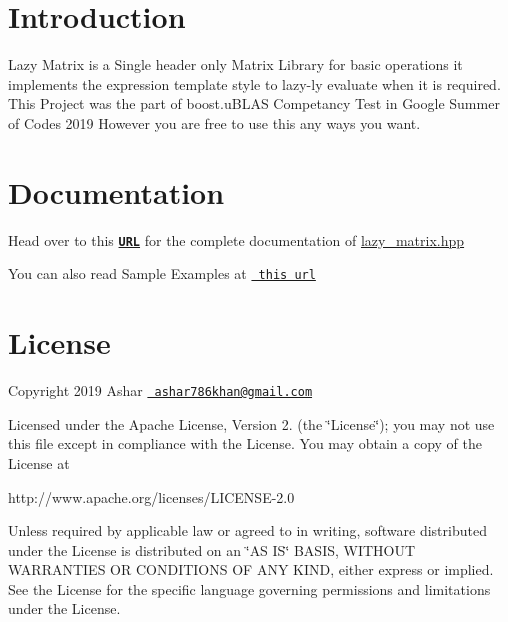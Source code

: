 \hypertarget{index_intro_sec}{}\section{Introduction}\label{index_intro_sec}
Lazy Matrix is a Single header only Matrix Library for basic operations it implements the expression template style to lazy-\/ly evaluate when it is required. This Project was the part of boost.\+u\+B\+L\+AS Competancy Test in Google Summer of Codes 2019 However you are free to use this any ways you want.\hypertarget{index_install_sec}{}\section{Documentation}\label{index_install_sec}
Head over to this \href{https://coder3101.github.io/gsoc19-boost-test/html/classboost_1_1test_1_1lazy__matrix.html}{\texttt{ {\bfseries{U\+RL}}}} for the complete documentation of {\ttfamily \mbox{\hyperlink{lazy__matrix_8hpp_source}{lazy\+\_\+matrix.\+hpp}}}

You can also read Sample Examples at \href{https://github.com/coder3101/gsoc19-boost-test}{\texttt{ this url}}\hypertarget{index_license}{}\section{License}\label{index_license}
Copyright 2019 Ashar \href{mailto:ashar786khan@gmail.com}{\texttt{ ashar786khan@gmail.\+com}}

Licensed under the Apache License, Version 2. (the \char`\"{}\+License\char`\"{}); you may not use this file except in compliance with the License. You may obtain a copy of the License at \begin{DoxyVerb}http://www.apache.org/licenses/LICENSE-2.0
\end{DoxyVerb}


Unless required by applicable law or agreed to in writing, software distributed under the License is distributed on an \char`\"{}\+A\+S I\+S\char`\"{} B\+A\+S\+IS, W\+I\+T\+H\+O\+UT W\+A\+R\+R\+A\+N\+T\+I\+ES OR C\+O\+N\+D\+I\+T\+I\+O\+NS OF A\+NY K\+I\+ND, either express or implied. See the License for the specific language governing permissions and limitations under the License. 